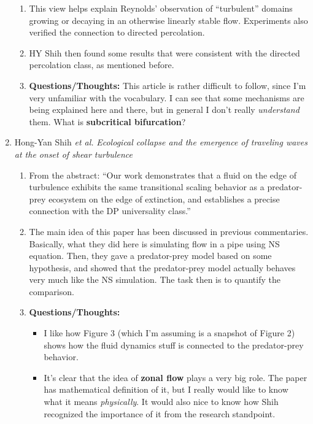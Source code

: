 \documentclass[11pt]{article}
\begin{document}
\begin{enumerate}
\begin{enumerate}
		\item This view helps explain Reynolds'
		observation of ``turbulent'' domains growing
		or decaying in an otherwise linearly
		stable flow. Experiments also verified the connection to directed percolation.
		
		\item HY Shih then found some results that were consistent with the directed percolation class, as mentioned before. 
		
		
		\item \textbf{Questions/Thoughts:} This article is rather difficult to follow, since I'm very unfamiliar with the vocabulary. I can see that some mechanisms are being explained here and there, but in general I don't really \textit{understand} them. What is \textbf{subcritical bifurcation}? 
	\end{enumerate}



\item Hong-Yan Shih \textit{et al.} \textit{Ecological collapse and the emergence of traveling waves at the onset of shear turbulence}
\begin{enumerate}
	\item From the abstract: ``Our work demonstrates that a fluid on the edge of turbulence exhibits the same transitional scaling behavior as a predator-prey ecosystem on the edge of extinction, and establishes a precise connection with the DP universality class.''
	
	\item The main idea of this paper has been discussed in previous commentaries. Basically, what they did here is simulating flow in a pipe using NS equation. Then, they gave a predator-prey model based on some hypothesis, and showed that the predator-prey model actually behaves very much like the NS simulation. The task then is to quantify the comparison. 
	
	\item \textbf{Questions/Thoughts:} 
	\begin{itemize}
		\item I like how Figure 3 (which I'm assuming is a snapshot of Figure 2) shows how the fluid dynamics stuff is connected to the predator-prey behavior. 
		\item It's clear that the idea of \textbf{zonal flow} plays a very big role. The paper has mathematical definition of it, but I really would like to know what it means \textit{physically}. It would also nice to know how Shih recognized the importance of it from the research standpoint. 
	\end{itemize}
\end{enumerate}
\end{enumerate}






  
\end{document}
